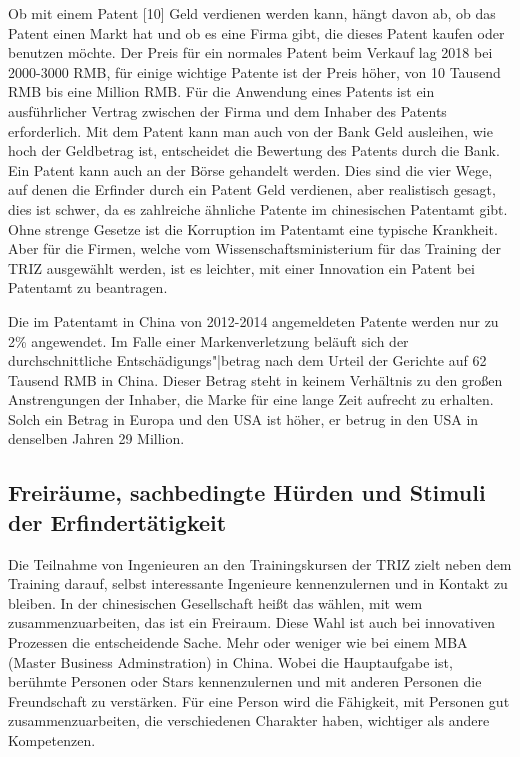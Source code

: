 \documentclass[11pt,a4paper]{article}
\begin{document}
Ob mit einem Patent [10] Geld verdienen werden kann, hängt davon ab, ob das
Patent einen Markt hat und ob es eine Firma gibt, die dieses Patent kaufen
oder benutzen möchte. Der Preis für ein normales Patent beim Verkauf lag 2018
bei 2000-3000 RMB, für einige wichtige Patente ist der Preis höher, von 10
Tausend RMB bis eine Million RMB. Für die Anwendung eines Patents ist ein
ausführlicher Vertrag zwischen der Firma und dem Inhaber des Patents
erforderlich.  Mit dem Patent kann man auch von der Bank Geld ausleihen, wie
hoch der Geldbetrag ist, entscheidet die Bewertung des Patents durch die Bank.
Ein Patent kann auch an der Börse gehandelt werden. Dies sind die vier Wege,
auf denen die Erfinder durch ein Patent Geld verdienen, aber realistisch
gesagt, dies ist schwer, da es zahlreiche ähnliche Patente im chinesischen
Patentamt gibt. Ohne strenge Gesetze ist die Korruption im Patentamt eine
typische Krankheit.  Aber für die Firmen, welche vom Wissenschaftsministerium
für das Training der TRIZ ausgewählt werden, ist es leichter, mit einer
Innovation ein Patent bei Patentamt zu beantragen.

Die im Patentamt in China von 2012-2014 angemeldeten Patente werden nur zu 2\%
angewendet.  Im Falle einer Markenverletzung beläuft sich der
durchschnittliche Entschädigungs"|betrag nach dem Urteil der Gerichte auf 62
Tausend RMB in China. Dieser Betrag steht in keinem Verhältnis zu den großen
Anstrengungen der Inhaber, die Marke für eine lange Zeit aufrecht zu erhalten.
Solch ein Betrag in Europa und den USA ist höher, er betrug in den USA in
denselben Jahren 29 Million.

\subsection{Freiräume, sachbedingte Hürden und Stimuli der Erfindertätigkeit} 

Die Teilnahme von Ingenieuren an den Trainingskursen der TRIZ zielt neben dem
Training darauf, selbst interessante Ingenieure kennenzulernen und in Kontakt
zu bleiben. In der chinesischen Gesellschaft heißt das wählen, mit wem
zusammenzuarbeiten, das ist ein Freiraum. Diese Wahl ist auch bei innovativen
Prozessen die entscheidende Sache. Mehr oder weniger wie bei einem MBA (Master
Business Adminstration) in China. Wobei die Hauptaufgabe ist, berühmte
Personen oder Stars kennenzulernen und mit anderen Personen die Freundschaft
zu verstärken. Für eine Person wird die Fähigkeit, mit Personen gut
zusammenzuarbeiten, die verschiedenen Charakter haben, wichtiger als andere
Kompetenzen.
\end{document}
